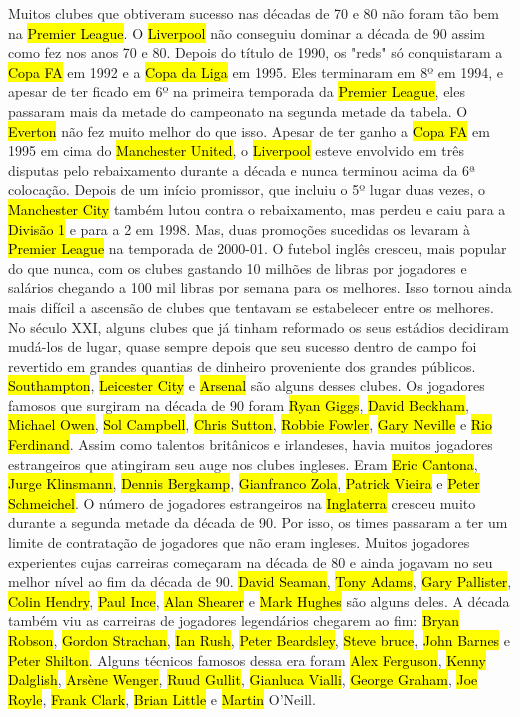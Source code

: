 \documentclass[a4paper,12pt]{article}
\begin{document}
Muitos clubes que obtiveram sucesso nas décadas de 70 e 80 não foram tão bem na \hl{Premier League}. O \hl{Liverpool} não conseguiu dominar a década de 90 assim como fez nos anos 70 e 80. Depois do título de 1990, os "reds" só conquistaram a \hl{Copa FA} em 1992 e a \hl{Copa da Liga} em 1995. Eles terminaram em 8º em 1994, e apesar de ter ficado em 6º na primeira temporada da \hl{Premier League}, eles passaram mais da metade do campeonato na segunda metade da tabela. O \hl{Everton} não fez muito melhor do que isso. Apesar de ter ganho a \hl{Copa FA} em 1995 em cima do \hl{Manchester United}, o \hl{Liverpool} esteve envolvido em três disputas pelo rebaixamento durante a década e nunca terminou acima da 6ª colocação. Depois de um início promissor, que incluiu o 5º lugar duas vezes, o \hl{Manchester City} também lutou contra o rebaixamento, mas perdeu e caiu para a \hl{Divisão 1} e para a 2 em 1998. Mas, duas promoções sucedidas os levaram à \hl{Premier League} na temporada de 2000-01.
O futebol inglês cresceu, mais popular do que nunca, com os clubes gastando 10 milhões de libras por jogadores e salários chegando a 100 mil libras por semana para os melhores. Isso tornou ainda mais difícil a ascensão de clubes que tentavam se estabelecer entre os melhores.
No século XXI, alguns clubes que já tinham reformado os seus estádios decidiram mudá-los de lugar, quase sempre depois que seu sucesso dentro de campo foi revertido em grandes quantias de dinheiro proveniente dos grandes públicos. \hl{Southampton}, \hl{Leicester City} e \hl{Arsenal} são alguns desses clubes.
Os jogadores famosos que surgiram na década de 90 foram \hl{Ryan Giggs}, \hl{David Beckham}, \hl{Michael Owen}, \hl{Sol Campbell}, \hl{Chris Sutton}, \hl{Robbie Fowler}, \hl{Gary Neville} e \hl{Rio Ferdinand}.
Assim como talentos britânicos e irlandeses, havia muitos jogadores estrangeiros que atingiram seu auge nos clubes ingleses. Eram \hl{Eric Cantona}, \hl{Jurge Klinsmann}, \hl{Dennis Bergkamp}, \hl{Gianfranco Zola}, \hl{Patrick Vieira} e \hl{Peter Schmeichel}. O número de jogadores estrangeiros na \hl{Inglaterra} cresceu muito durante a segunda metade da década de 90. Por isso, os times passaram a ter um limite de contratação de jogadores que não eram ingleses. 
Muitos jogadores experientes cujas carreiras começaram na década de 80 e ainda jogavam no seu melhor nível ao fim da década de 90. \hl{David Seaman}, \hl{Tony Adams}, \hl{Gary Pallister}, \hl{Colin Hendry}, \hl{Paul Ince}, \hl{Alan Shearer} e \hl{Mark Hughes} são alguns deles. A década também viu as carreiras de jogadores legendários chegarem ao fim: \hl{Bryan Robson}, \hl{Gordon Strachan}, \hl{Ian Rush}, \hl{Peter Beardsley}, \hl{Steve bruce}, \hl{John Barnes} e \hl{Peter Shilton}. Alguns técnicos famosos dessa era foram \hl{Alex Ferguson}, \hl{Kenny Dalglish}, \hl{Arsène Wenger}, \hl{Ruud Gullit}, \hl{Gianluca Vialli}, \hl{George Graham}, \hl{Joe Royle}, \hl{Frank Clark}, \hl{Brian Little} e \hl{Martin} O’Neill.
\end{document}
